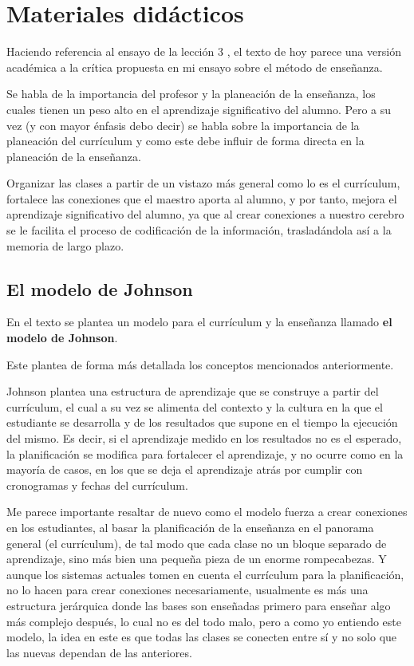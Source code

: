 \section{Materiales didácticos}

Haciendo referencia al ensayo de la lección 3 \cite{Ensayo}, el texto de hoy parece una versión académica a la crítica propuesta en mi ensayo sobre el método de enseñanza.

Se habla de la importancia del profesor y la planeación de la enseñanza, los cuales tienen un peso alto en el aprendizaje significativo del alumno. Pero a su vez (y con mayor énfasis debo decir) se habla sobre la importancia de la planeación del currículum y como este debe influir de forma directa en la planeación de la enseñanza.

Organizar las clases a partir de un vistazo más general como lo es el currículum, fortalece las conexiones que el maestro aporta al alumno, y por tanto, mejora el aprendizaje significativo del alumno, ya que al crear conexiones a nuestro cerebro se le facilita el proceso de codificación de la información, trasladándola así a la memoria de largo plazo.

\subsection{El modelo de Johnson}

En el texto se plantea un modelo para el currículum y la enseñanza llamado \textbf{el modelo de Johnson}.

Este plantea de forma más detallada los conceptos mencionados anteriormente. 

Johnson plantea una estructura de aprendizaje que se construye a partir del currículum, el cual a su vez se alimenta del contexto y la cultura en la que el estudiante se desarrolla y de los resultados que supone en el tiempo la ejecución del mismo.
Es decir, si el aprendizaje medido en los resultados no es el esperado, la planificación se modifica para fortalecer el aprendizaje, y no ocurre como en la mayoría de casos, en los que se deja el aprendizaje atrás por cumplir con cronogramas y fechas del currículum.

Me parece importante resaltar de nuevo como el modelo fuerza a crear conexiones en los estudiantes, al basar la planificación de la enseñanza en el panorama general (el currículum), de tal modo que cada clase no un bloque separado de aprendizaje, sino más bien una pequeña pieza de un enorme rompecabezas. Y aunque los sistemas actuales tomen en cuenta el currículum para la planificación, no lo hacen para crear conexiones necesariamente, usualmente es más una estructura jerárquica donde las bases son enseñadas primero para enseñar algo más complejo después, lo cual no es del todo malo, pero a como yo entiendo este modelo, la idea en este es que todas las clases se conecten entre sí y no solo que las nuevas dependan de las anteriores.

